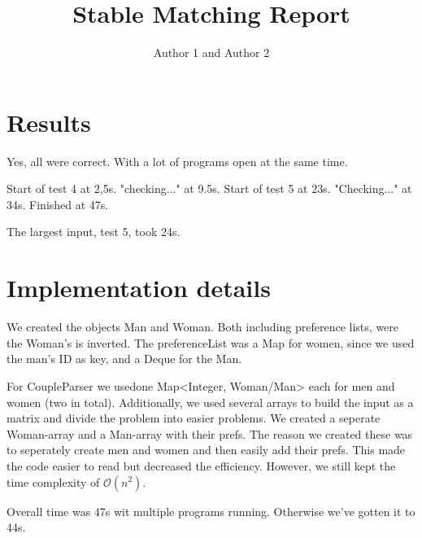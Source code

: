 \documentclass{article}
\title{Stable Matching Report}
\author{Author 1 and Author 2}
\begin{document}
  \maketitle

  \section{Results}

  
  Yes, all were correct. With a lot of programs open at the same time.
  
  Start of test 4 at 2,5s.
  "checking..." at 9.5s.
  Start of test 5 at 23s.
  "Checking..." at 34s.
  Finished at 47s.
  
  The largest input, test 5, took 24s.
  
  
  

  \section{Implementation details}

  
  We created the objects Man and Woman. Both including preference lists, were the Woman's is inverted. The preferenceList was a Map for women, since we used the man's ID as key, and a Deque for the Man.
  
  For CoupleParser we usedone Map<Integer, Woman/Man> each for men and women (two in total). Additionally, we used several arrays to build the input as a matrix and divide the problem into easier problems. We created a seperate Woman-array and a Man-array with their prefs. The reason we created these was to seperately create men and women and then easily add their prefs. This made the code easier to read but decreased the efficiency. However, we still kept the time complexity of $\mathcal{O}(n^{2})$.
  
  Overall time was 47s wit multiple programs running. Otherwise we've gotten it to 44s.
  
  
\end{document}
